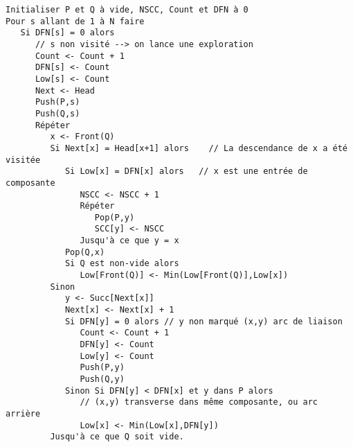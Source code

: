 \documentclass{article}
\begin{document}
\begin{verbatim}
Initialiser P et Q à vide, NSCC, Count et DFN à 0
Pour s allant de 1 à N faire
   Si DFN[s] = 0 alors
      // s non visité --> on lance une exploration
      Count <- Count + 1
      DFN[s] <- Count
      Low[s] <- Count
      Next <- Head
      Push(P,s)
      Push(Q,s)
      Répéter
         x <- Front(Q)
         Si Next[x] = Head[x+1] alors    // La descendance de x a été visitée
            Si Low[x] = DFN[x] alors   // x est une entrée de composante
               NSCC <- NSCC + 1
               Répéter
                  Pop(P,y)
                  SCC[y] <- NSCC
               Jusqu'à ce que y = x
            Pop(Q,x)
            Si Q est non-vide alors
               Low[Front(Q)] <- Min(Low[Front(Q)],Low[x])
         Sinon
            y <- Succ[Next[x]]
            Next[x] <- Next[x] + 1
            Si DFN[y] = 0 alors // y non marqué (x,y) arc de liaison
               Count <- Count + 1
               DFN[y] <- Count
               Low[y] <- Count
               Push(P,y)
               Push(Q,y)
            Sinon Si DFN[y] < DFN[x] et y dans P alors
               // (x,y) transverse dans même composante, ou arc arrière
               Low[x] <- Min(Low[x],DFN[y])
         Jusqu'à ce que Q soit vide.
\end{verbatim}
\end{document}
